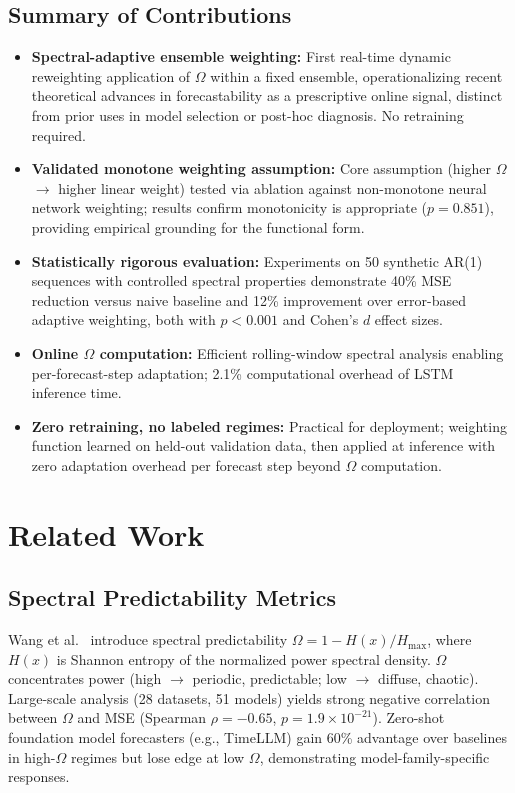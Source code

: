 \documentclass[11pt,letterpaper]{article}
\begin{document}
\subsection{Summary of Contributions}

\begin{itemize}
  \item \textbf{Spectral-adaptive ensemble weighting:} First real-time dynamic reweighting application of $\Omega$ within a fixed ensemble, operationalizing recent theoretical advances in forecastability as a prescriptive online signal, distinct from prior uses in model selection or post-hoc diagnosis. No retraining required.
  \item \textbf{Validated monotone weighting assumption:} Core assumption (higher $\Omega$ $\rightarrow$ higher linear weight) tested via ablation against non-monotone neural network weighting; results confirm monotonicity is appropriate ($p = 0.851$), providing empirical grounding for the functional form.
  \item \textbf{Statistically rigorous evaluation:} Experiments on 50 synthetic AR(1) sequences with controlled spectral properties demonstrate 40\% MSE reduction versus naive baseline and 12\% improvement over error-based adaptive weighting, both with $p < 0.001$ and Cohen's $d$ effect sizes.
  \item \textbf{Online $\Omega$ computation:} Efficient rolling-window spectral analysis enabling per-forecast-step adaptation; 2.1\% computational overhead of LSTM inference time.
  \item \textbf{Zero retraining, no labeled regimes:} Practical for deployment; weighting function learned on held-out validation data, then applied at inference with zero adaptation overhead per forecast step beyond $\Omega$ computation.
\end{itemize}

\section{Related Work}

\subsection{Spectral Predictability Metrics}

Wang et al.~\cite{Wang2025} introduce spectral predictability $\Omega = 1 - H(x)/H_{\max}$, where $H(x)$ is Shannon entropy of the normalized power spectral density. $\Omega$ concentrates power (high $\rightarrow$ periodic, predictable; low $\rightarrow$ diffuse, chaotic). Large-scale analysis (28 datasets, 51 models) yields strong negative correlation between $\Omega$ and MSE (Spearman $\rho = -0.65$, $p = 1.9 \times 10^{-21}$). Zero-shot foundation model forecasters (e.g., TimeLLM) gain 60\% advantage over baselines in high-$\Omega$ regimes but lose edge at low $\Omega$, demonstrating model-family-specific responses.
\end{document}
